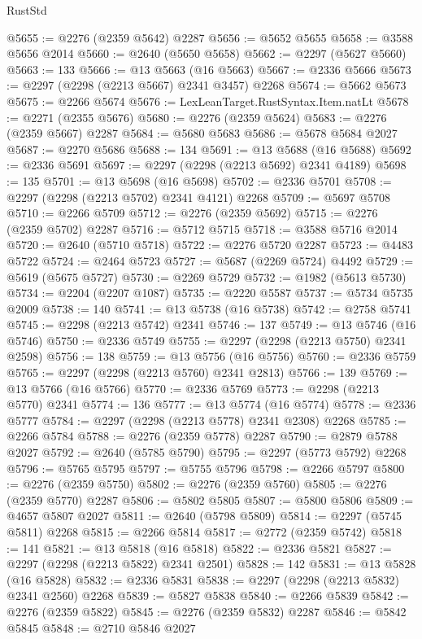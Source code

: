 \begin{lexlean}{RustStd}
\begin{coremodule}
@5655 := @2276 (@2359 @5642) @2287
@5656 := @5652 @5655
@5658 := @3588 @5656 @2014
@5660 := @2640 (@5650 @5658)
@5662 := @2297 (@5627 @5660)
@5663 := 133
@5666 := @13 @5663 (@16 @5663)
@5667 := @2336 @5666
@5673 := @2297 (@2298 (@2213 @5667) @2341 @3457) @2268
@5674 := @5662 @5673
@5675 := @2266 @5674
@5676 := LexLeanTarget.RustSyntax.Item.natLt
@5678 := @2271 (@2355 @5676)
@5680 := @2276 (@2359 @5624)
@5683 := @2276 (@2359 @5667) @2287
@5684 := @5680 @5683
@5686 := @5678 @5684 @2027
@5687 := @2270 @5686
@5688 := 134
@5691 := @13 @5688 (@16 @5688)
@5692 := @2336 @5691
@5697 := @2297 (@2298 (@2213 @5692) @2341 @4189)
@5698 := 135
@5701 := @13 @5698 (@16 @5698)
@5702 := @2336 @5701
@5708 := @2297 (@2298 (@2213 @5702) @2341 @4121) @2268
@5709 := @5697 @5708
@5710 := @2266 @5709
@5712 := @2276 (@2359 @5692)
@5715 := @2276 (@2359 @5702) @2287
@5716 := @5712 @5715
@5718 := @3588 @5716 @2014
@5720 := @2640 (@5710 @5718)
@5722 := @2276 @5720 @2287
@5723 := @4483 @5722
@5724 := @2464 @5723
@5727 := @5687 (@2269 @5724) @4492
@5729 := @5619 (@5675 @5727)
@5730 := @2269 @5729
@5732 := @1982 (@5613 @5730)
@5734 := @2204 (@2207 @1087)
@5735 := @2220 @5587
@5737 := @5734 @5735 @2009
@5738 := 140
@5741 := @13 @5738 (@16 @5738)
@5742 := @2758 @5741
@5745 := @2298 (@2213 @5742) @2341
@5746 := 137
@5749 := @13 @5746 (@16 @5746)
@5750 := @2336 @5749
@5755 := @2297 (@2298 (@2213 @5750) @2341 @2598)
@5756 := 138
@5759 := @13 @5756 (@16 @5756)
@5760 := @2336 @5759
@5765 := @2297 (@2298 (@2213 @5760) @2341 @2813)
@5766 := 139
@5769 := @13 @5766 (@16 @5766)
@5770 := @2336 @5769
@5773 := @2298 (@2213 @5770) @2341
@5774 := 136
@5777 := @13 @5774 (@16 @5774)
@5778 := @2336 @5777
@5784 := @2297 (@2298 (@2213 @5778) @2341 @2308) @2268
@5785 := @2266 @5784
@5788 := @2276 (@2359 @5778) @2287
@5790 := @2879 @5788 @2027
@5792 := @2640 (@5785 @5790)
@5795 := @2297 (@5773 @5792) @2268
@5796 := @5765 @5795
@5797 := @5755 @5796
@5798 := @2266 @5797
@5800 := @2276 (@2359 @5750)
@5802 := @2276 (@2359 @5760)
@5805 := @2276 (@2359 @5770) @2287
@5806 := @5802 @5805
@5807 := @5800 @5806
@5809 := @4657 @5807 @2027
@5811 := @2640 (@5798 @5809)
@5814 := @2297 (@5745 @5811) @2268
@5815 := @2266 @5814
@5817 := @2772 (@2359 @5742)
@5818 := 141
@5821 := @13 @5818 (@16 @5818)
@5822 := @2336 @5821
@5827 := @2297 (@2298 (@2213 @5822) @2341 @2501)
@5828 := 142
@5831 := @13 @5828 (@16 @5828)
@5832 := @2336 @5831
@5838 := @2297 (@2298 (@2213 @5832) @2341 @2560) @2268
@5839 := @5827 @5838
@5840 := @2266 @5839
@5842 := @2276 (@2359 @5822)
@5845 := @2276 (@2359 @5832) @2287
@5846 := @5842 @5845
@5848 := @2710 @5846 @2027

\end{coremodule}
\end{lexlean}
